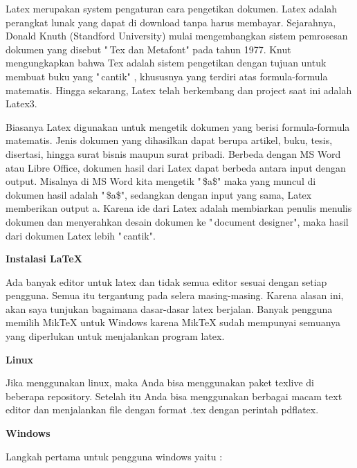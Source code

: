\documentclass[12pt,a4paper]{article}
\begin{document}
Latex merupakan system pengaturan cara pengetikan dokumen. Latex adalah perangkat lunak yang dapat di download tanpa harus membayar. Sejarahnya, Donald Knuth (Standford University) mulai mengembangkan sistem pemrosesan dokumen yang disebut "\,Tex dan Metafont" pada tahun 1977. Knut mengungkapkan bahwa Tex adalah sistem pengetikan dengan tujuan 
untuk membuat buku yang "\,cantik" , khususnya yang terdiri atas formula-formula matematis. Hingga sekarang, Latex telah berkembang dan project saat ini adalah Latex3.\par \vspace{12pt}

Biasanya Latex digunakan untuk mengetik dokumen yang berisi 
formula-formula matematis. Jenis dokumen yang dihasilkan dapat berupa artikel, buku, tesis, disertasi, hingga surat bisnis maupun surat pribadi. Berbeda dengan MS Word atau Libre Office, dokumen hasil dari Latex dapat berbeda antara input dengan output. Misalnya di MS Word kita mengetik "\,\$a\$" maka yang muncul di dokumen hasil adalah "\,\$a\$", sedangkan 
dengan input yang sama, Latex memberikan output a. Karena ide dari Latex adalah membiarkan penulis menulis dokumen dan menyerahkan desain dokumen ke "\,document designer", maka hasil dari dokumen Latex lebih "\,cantik".\par \vspace{12pt}

\textbf{Instalasi LaTeX}\par \vspace{12pt}

Ada banyak editor untuk latex dan tidak semua editor sesuai dengan setiap pengguna. Semua itu tergantung pada selera masing-masing. Karena alasan ini, akan saya tunjukan bagaimana dasar-dasar latex berjalan. Banyak pengguna memilih MikTeX untuk Windows karena MikTeX sudah mempunyai semuanya yang diperlukan untuk menjalankan program latex. 
\par \vspace{12pt}
\textbf{Linux}
\par \vspace{12pt}
Jika menggunakan linux, maka Anda bisa menggunakan paket texlive di beberapa repository. Setelah itu Anda bisa menggunakan berbagai macam text editor dan menjalankan file dengan format .tex dengan perintah pdflatex.
\par \vspace{12pt}
\textbf{Windows}
\par \vspace{12pt}
Langkah pertama untuk pengguna windows yaitu :
\end{document}
